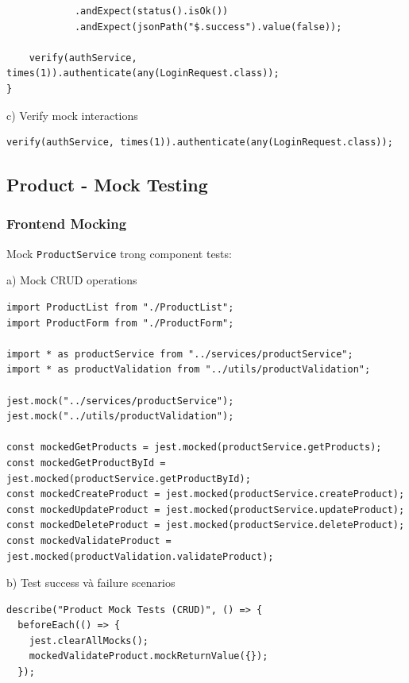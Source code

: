 \documentclass[a4paper,12pt]{article}
\begin{document}
{\begin{tcolorbox}[breakable, colback=green!5,colframe=black!50,title=Test Controller Với Mocked Service ]
\begin{lstlisting}
            .andExpect(status().isOk())
            .andExpect(jsonPath("$.success").value(false));

    verify(authService, times(1)).authenticate(any(LoginRequest.class));
}

\end{lstlisting}
\end{tcolorbox}
c) Verify mock interactions
\begin{tcolorbox}[breakable, colback=green!5,colframe=black!50,title=Verify Mock Interactions ]
\begin{lstlisting}
verify(authService, times(1)).authenticate(any(LoginRequest.class));
\end{lstlisting}
\end{tcolorbox}

\subsection{Product - Mock Testing}

\subsubsection{Frontend Mocking}

Mock \texttt{ProductService} trong component tests:


a) Mock CRUD operations
\begin{tcolorbox}[breakable, colback=green!5,colframe=black!50,title= Mock CRUD Operations ]
\begin{lstlisting}
import ProductList from "./ProductList";
import ProductForm from "./ProductForm";

import * as productService from "../services/productService";
import * as productValidation from "../utils/productValidation";

jest.mock("../services/productService");
jest.mock("../utils/productValidation");

const mockedGetProducts = jest.mocked(productService.getProducts);
const mockedGetProductById = jest.mocked(productService.getProductById);
const mockedCreateProduct = jest.mocked(productService.createProduct);
const mockedUpdateProduct = jest.mocked(productService.updateProduct);
const mockedDeleteProduct = jest.mocked(productService.deleteProduct);
const mockedValidateProduct = jest.mocked(productValidation.validateProduct);

\end{lstlisting}
\end{tcolorbox}
b) Test success và failure scenarios
\begin{tcolorbox}[breakable, colback=green!5,colframe=black!50,title=Test Success Và Failure Scenarios ]
\begin{lstlisting}
describe("Product Mock Tests (CRUD)", () => {
  beforeEach(() => {
    jest.clearAllMocks();
    mockedValidateProduct.mockReturnValue({});
  });


\end{lstlisting}
\end{tcolorbox}}
\end{document}
